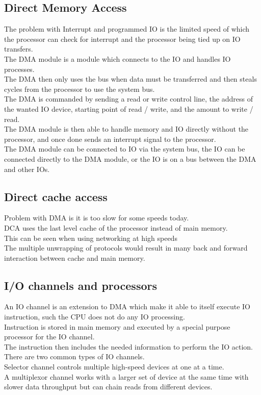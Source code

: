 \documentclass[12pt, a4paper]{article}
\begin{document}
		\subsection{Direct Memory Access}
			The problem with Interrupt and programmed IO is the limited speed of which the processor can check for interrupt and the processor being tied up on IO transfers.\\
			The DMA module is a module which connects to the IO and handles IO processes.\\
			The DMA then only uses the bus when data must be transferred and then steals cycles from the processor to use the system bus.\\
			The DMA is commanded by sending a read or write control line, the address of the wanted IO device, starting point of read / write, and the amount to write / read.\\
			The DMA module is then able to handle memory and IO directly without the processor, and once done sends an interrupt signal to the processor.\\
			The DMA module can be connected to IO via the system bus, the IO can be connected directly to the DMA module, or the IO is on a bus between the DMA and other IOs.\\
		\subsection{Direct cache access}
			Problem with DMA is it is too slow for some speeds today.\\
			DCA uses the last level cache of the processor instead of main memory.\\
			This can be seen when using networking at high speeds\\
			The multiple unwrapping of protocols would result in many back and forward interaction between cache and main memory.\\
		\subsection{I/O channels and processors}
			An IO channel is an extension to DMA which make it able to itself execute IO instruction, such the CPU does not do any IO processing.\\
			Instruction is stored in main memory and executed by a special purpose processor for the IO channel.\\
			The instruction then includes the needed information to perform the IO action.\\
			There are two common types of IO channels.\\
			Selector channel controls multiple high-speed devices at one at a time. \\
			A multiplexor channel works with a larger set of device at the same time with slower data throughput but can chain reads from different devices.
\end{document}
